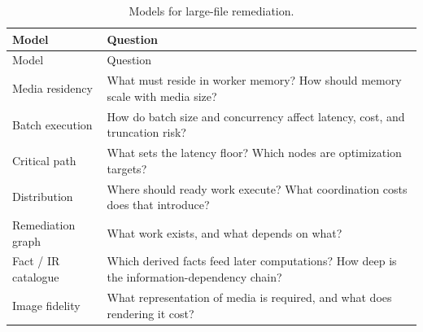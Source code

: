 {\footnotesize
\begin{longtable}[]{@{}
  >{\raggedright\arraybackslash}p{}
  >{\raggedright\arraybackslash}p{}@{}}
\caption[Models for large-file remediation]{Models for large-file remediation.}\label{interlude-model-family}\tabularnewline
\toprule\noalign{}
\begin{minipage}[b]{\linewidth}\raggedright
Model
\end{minipage} & \begin{minipage}[b]{\linewidth}\raggedright
Question
\end{minipage} \\
\midrule\noalign{}
\endfirsthead
\toprule\noalign{}
\begin{minipage}[b]{\linewidth}\raggedright
Model
\end{minipage} & \begin{minipage}[b]{\linewidth}\raggedright
Question
\end{minipage} \\
\midrule\noalign{}
\endhead
\bottomrule\noalign{}
\endlastfoot
Media residency & What must reside in worker memory? How should memory scale with media size? \\
Batch execution & How do batch size and concurrency affect latency, cost, and truncation risk? \\
Critical path & What sets the latency floor? Which nodes are optimization targets? \\
Distribution & Where should ready work execute? What coordination costs does that introduce? \\
Remediation graph & What work exists, and what depends on what? \\
Fact / IR catalogue & Which derived facts feed later computations? How deep is the information-dependency chain? \\
Image fidelity & What representation of media is required, and what does rendering it cost? \\
\end{longtable}
}

